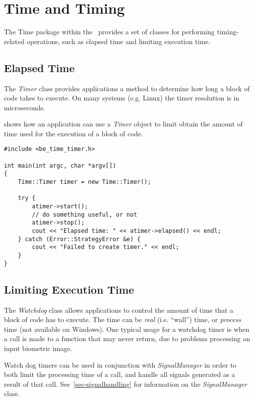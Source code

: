 %
%
\chapter{Time and Timing}
\label{chp-time}

The Time package within the \lname\ provides a set of classes for performing
timing-related operations, such as elapsed time and limiting execution time.

\section{Elapsed Time}

The {\em Timer} class provides applications a method to determine how long
a block of code takes to execute. On many systems (e.g. Linux) the timer
resolution is in microseconds.

 shows how an application can use a {\em Timer}
object to limit obtain the amount of time used for the execution of a block
of code.

\begin{lstlisting}[caption={Using the Timer}, label=timeruse]
#include <be_time_timer.h>

int main(int argc, char *argv[])
{
	Time::Timer timer = new Time::Timer();

	try {
		atimer->start();
		// do something useful, or not
		atimer->stop();
		cout << "Elapsed time: " << atimer->elapsed() << endl;
	} catch (Error::StrategyError &e) {
		cout << "Failed to create timer." << endl;
	}
}
\end{lstlisting}

\section{Limiting Execution Time}

The {\em Watchdog} class allows applications to control the amount of time
that a block of code has to execute. The time can be {\em real} (i.e. ``wall'')
time, or {\em process} time (not available on Windows). One typical usage for
a watchdog timer is when a call is made to a function that may never return,
due to problems processing an input biometric image.

Watch dog timers can be used in conjunction with {\em SignalManager} in
order to both limit the processing time of a call, and handle all signals
generated as a result of that call. See~\ref{sec-signalhandling} for
information on the {\em SignalManager} class.

